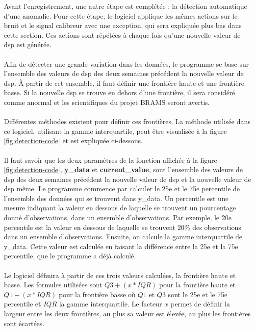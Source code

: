 \documentclass[11pt]{article}
\begin{document}
Avant l'enregistrement, une autre étape est complétée : la détection automatique d'une anomalie.
Pour cette étape, le logiciel applique les mêmes actions sur le bruit et le signal calibreur avec une exception, qui sera expliquée plus bas dans cette section.
Ces actions sont répétées à chaque fois qu'une nouvelle valeur de dsp est générée.\\
\\
Afin de détecter une grande variation dans les données, le programme se base sur l'ensemble des valeurs de dsp des deux semaines précédent la nouvelle valeur de dsp.
À partir de cet ensemble, il faut définir une frontière haute et une frontière basse.
Si la nouvelle dsp se trouve en dehors d'une frontière, il sera considéré comme anormal et les scientifiques du projet BRAMS seront avertis.\\
\\
Différentes méthodes existent pour définir ces frontières.
La méthode utilisée dans ce logiciel, utilisant la gamme interquartile, peut être visualisée à la figure \ref{fig:detection-code} et est expliquée ci-dessous.\\
\\
Il faut savoir que les deux paramètres de la fonction affichée à la figure \ref{fig:detection-code}, \textbf{y\_data} et \textbf{current\_value}, sont l'ensemble des valeurs de dsp des deux semaines précédent la nouvelle valeur de dsp et la nouvelle valeur de dsp même.
Le programme commence par calculer le 25e et le 75e percentile de l'ensemble des données qui se trouvent dans y\_data.
Un percentile est une mesure indiquant la valeur en dessous de laquelle se trouvent un pourcentage donné d'observations, dans un ensemble d'observations.
Par exemple, le 20e percentile est la valeur en dessous de laquelle se trouvent 20\% des observations dans un ensemble d'observations.
Ensuite, on calcule la gamme interquartile de y\_data.
Cette valeur est calculée en faisant la différence entre la 25e et la 75e percentile, que le programme a déjà calculé.\\
\\
Le logiciel définira à partir de ces trois valeurs calculées, la frontière haute et basse.
Les formules utilisées sont \(Q3 + (x * IQR)\) pour la frontière haute et \(Q1 - (x * IQR)\) pour la frontière basse où \(Q1\) et \(Q3\) sont le 25e et le 75e percentile et \(IQR\) la gamme interquartile.
Le facteur \(x\) permet de définir la largeur entre les deux frontières, au plus sa valeur est élevée, au plus les frontières sont écartées.\\
\end{document}
